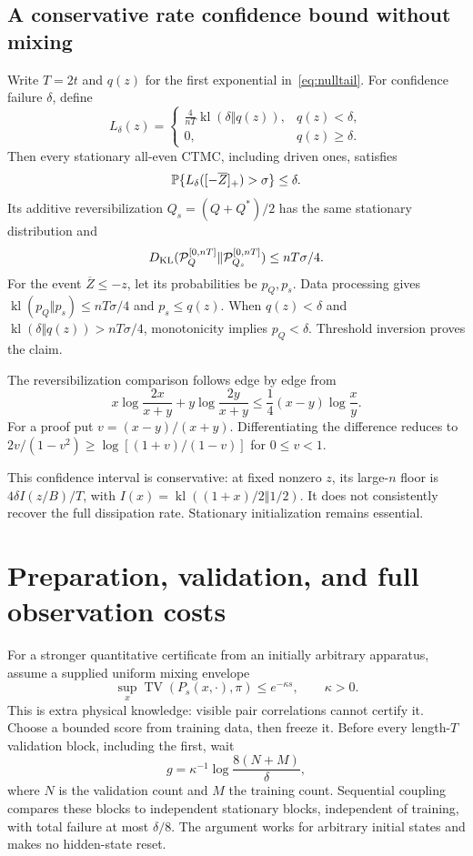 \documentclass[11pt,a4paper]{article}
\newcommand{\TV}{\operatorname{TV}}\newcommand{\atanh}{\operatorname{artanh}}
\begin{document}
\subsection{A conservative rate confidence bound without mixing}
Write $T=2t$ and $q(z)$ for the first exponential in~\eqref{eq:nulltail}. For confidence failure $\delta$, define
\begin{equation}\label{eq:nomixCI}
L_\delta(z)=\begin{cases}
\displaystyle\frac4{nT}\operatorname{kl}(\delta\Vert q(z)),&q(z)<\delta,\\[3pt]
0,&q(z)\geq\delta.
\end{cases}
\end{equation}
Then every stationary all-even CTMC, including driven ones, satisfies
\[
\mathbb P\{L_\delta([-\overline Z]_+)>\sigma\}\leq\delta.
\]
Its additive reversibilization $Q_s=(Q+Q^*)/2$ has the same stationary distribution and
\[
D_{\mathrm{KL}}(\mathcal P_Q^{[0,nT]}\Vert\mathcal P_{Q_s}^{[0,nT]})\leq nT\sigma/4.
\]
For the event $\overline Z\leq-z$, let its probabilities be $p_Q,p_s$. Data processing gives $\operatorname{kl}(p_Q\Vert p_s)\leq nT\sigma/4$ and $p_s\leq q(z)$. When $q(z)<\delta$ and $\operatorname{kl}(\delta\Vert q(z))>nT\sigma/4$, monotonicity implies $p_Q<\delta$. Threshold inversion proves the claim.

The reversibilization comparison follows edge by edge from
\[
x\log\frac{2x}{x+y}+y\log\frac{2y}{x+y}
\leq\frac14(x-y)\log\frac xy.
\]
For a proof put $v=(x-y)/(x+y)$. Differentiating the difference reduces to $2v/(1-v^2)\geq\log[(1+v)/(1-v)]$ for $0\leq v<1$.

This confidence interval is conservative: at fixed nonzero $z$, its large-$n$ floor is $4\delta I(z/B)/T$, with $I(x)=\operatorname{kl}((1+x)/2\Vert1/2)$. It does not consistently recover the full dissipation rate. Stationary initialization remains essential.

\section{Preparation, validation, and full observation costs}
For a stronger quantitative certificate from an initially arbitrary apparatus, assume a supplied uniform mixing envelope
\[
\sup_x\TV(P_s(x,\cdot),\pi)\leq e^{-\kappa s},\qquad\kappa>0.
\]
This is extra physical knowledge: visible pair correlations cannot certify it. Choose a bounded score from training data, then freeze it. Before every length-$T$ validation block, including the first, wait
\[
g=\kappa^{-1}\log\frac{8(N+M)}\delta,
\]
where $N$ is the validation count and $M$ the training count. Sequential coupling compares these blocks to independent stationary blocks, independent of training, with total failure at most $\delta/8$. The argument works for arbitrary initial states and makes no hidden-state reset.
\end{document}
